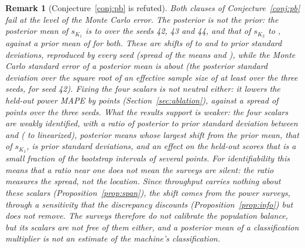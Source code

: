 \documentclass[journal]{IEEEtran}
\newtheorem{remark}{Remark}
\begin{document}
\begin{remark}[Conjecture~\ref{conj:pb} is refuted]\label{rem:pb}
Both clauses of Conjecture~\ref{conj:pb} fail at the level of the Monte Carlo error. The posterior is not the prior: the
posterior mean of $s_{K_1}$ is \seedMeanKOneMin{} to \seedMeanKOneMax{} over the seeds 42, 43 and 44, and that of
$s_{K_2}$ \seedMeanKTwoMin{} to \seedMeanKTwoMax, against a prior mean of \pmKOne{} for both. These are shifts of
\shiftKOneMin{} to \shiftKOneMax{} and \shiftKTwoMin{} to \shiftKTwoMax{} prior standard deviations, reproduced by every seed
(spread of the means \seedMeanSpreadKOne{} and \seedMeanSpreadKTwo), while the Monte Carlo standard error of a posterior
mean is about \mcseKOne{} (the posterior standard deviation over the square root of an effective sample size of at least
\essMin{} over the three seeds, \essAll{} for seed 42). Fixing the four scalars is not neutral either: it lowers the held-out power MAPE by \balFixGainKw{} points
(Section~\ref{sec:ablation}), against a spread of \seedSpreadKw{} points over the three seeds. What the results support is
weaker: the four scalars are weakly identified, with a ratio of posterior to prior standard deviation between
\kOneScaleContr{} and \kTwoScaleContr{} (\thLapPbMin{} to \thLapPbMax{} linearized), posterior means whose largest shift
from the prior mean, that of $s_{K_1}$, is \shiftKOneMax{} prior standard deviations, and an effect on the held-out scores
that is a small fraction of the bootstrap intervals of several points. For identifiability this means that a ratio near
one does not mean the surveys are silent: the ratio measures the spread, not the location. Since throughput carries
nothing about these scalars (Proposition~\ref{prop:span}), the shift comes from the power surveys, through a sensitivity
that the discrepancy discounts (Proposition~\ref{prop:info}) but does not remove.
The surveys therefore do not calibrate the population balance, but its scalars are not free of them either, and a
posterior mean of a classification multiplier is not an estimate of the machine's classification.
\end{remark}

\begin{table}[!t]
\caption{Theory against the sampler on the fit to all ten surveys: the share of each scalar's power sensitivity inside the column space of the discrepancy design, the ratio of posterior to prior standard deviation predicted by the linearized posterior~\eqref{eq:laplace} and mapped to the natural scale by the delta method, and the ratio the sampler measured on the natural scale.}
\label{tab:laplace}
\centering\footnotesize
\setlength{\tabcolsep}{4pt}
\end{table}
\end{document}
